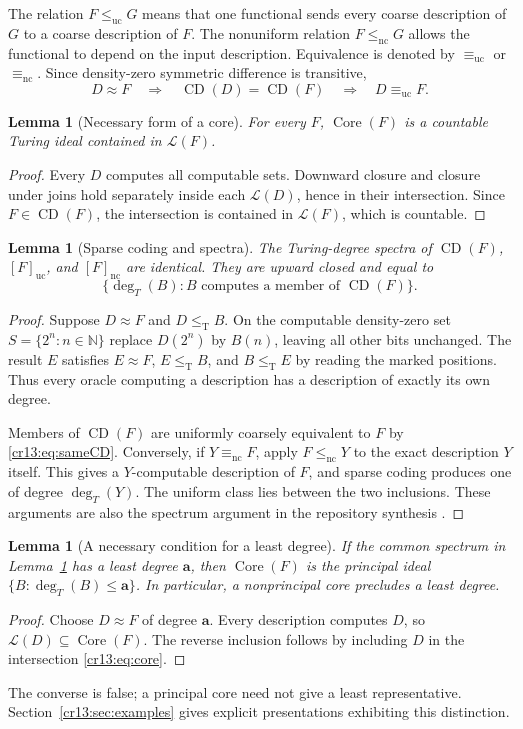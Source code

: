 \documentclass[11pt,letterpaper]{article}
\newtheorem{lemma}[theorem]{Lemma}
\theoremstyle{definition}
\theoremstyle{remark}\newtheorem{remark}[theorem]{Remark}
\numberwithin{equation}{section}
\newcommand{\N}{\mathbb N}
\newcommand{\leT}{\leq_{\mathrm T}}
\newcommand{\leuc}{\leq_{\mathrm{uc}}}
\newcommand{\lenc}{\leq_{\mathrm{nc}}}
\newcommand{\equc}{\equiv_{\mathrm{uc}}}
\newcommand{\eqnc}{\equiv_{\mathrm{nc}}}
\newcommand{\Low}{\mathcal L}
\newcommand{\Core}{\operatorname{Core}}
\newcommand{\CD}{\operatorname{CD}}
\begin{document}
The relation $F\leuc G$ means that one functional sends every coarse description of $G$ to a coarse description of $F$. The nonuniform relation $F\lenc G$ allows the functional to depend on the input description. Equivalence is denoted by $\equc$ or $\eqnc$. Since density-zero symmetric difference is transitive,
\begin{equation}\label{cr13:eq:sameCD}
       D\approx F\quad\Longrightarrow\quad
       \CD(D)=\CD(F)\quad\Longrightarrow\quad D\equc F.
\end{equation}

\begin{lemma}[Necessary form of a core]\label{cr13:lem:coreideal}
For every $F$, $\Core(F)$ is a countable Turing ideal contained in $\Low(F)$.
\end{lemma}
\begin{proof}
Every $D$ computes all computable sets. Downward closure and closure under joins hold separately inside each $\Low(D)$, hence in their intersection. Since $F\in\CD(F)$, the intersection is contained in $\Low(F)$, which is countable.
\end{proof}

\begin{lemma}[Sparse coding and spectra]\label{cr13:lem:spectra}
The Turing-degree spectra of $\CD(F)$, $[F]_{\mathrm{uc}}$, and $[F]_{\mathrm{nc}}$ are identical. They are upward closed and equal to
\[
 \{\deg_T(B): B\text{ computes a member of }\CD(F)\}.
\]
\end{lemma}
\begin{proof}
Suppose $D\approx F$ and $D\leT B$. On the computable density-zero set $S=\{2^n:n\in\N\}$ replace $D(2^n)$ by $B(n)$, leaving all other bits unchanged. The result $E$ satisfies $E\approx F$, $E\leT B$, and $B\leT E$ by reading the marked positions. Thus every oracle computing a description has a description of exactly its own degree.

Members of $\CD(F)$ are uniformly coarsely equivalent to $F$ by \eqref{cr13:eq:sameCD}. Conversely, if $Y\eqnc F$, apply $F\lenc Y$ to the exact description $Y$ itself. This gives a $Y$-computable description of $F$, and sparse coding produces one of degree $\deg_T(Y)$. The uniform class lies between the two inclusions. These arguments are also the spectrum argument in the repository synthesis \cite{Synthesis}.
\end{proof}

\begin{lemma}[A necessary condition for a least degree]\label{cr13:lem:leastcore}
If the common spectrum in Lemma~\ref{cr13:lem:spectra} has a least degree $\mathbf a$, then $\Core(F)$ is the principal ideal $\{B:\deg_T(B)\le\mathbf a\}$. In particular, a nonprincipal core precludes a least degree.
\end{lemma}
\begin{proof}
Choose $D\approx F$ of degree $\mathbf a$. Every description computes $D$, so $\Low(D)\subseteq\Core(F)$. The reverse inclusion follows by including $D$ in the intersection \eqref{cr13:eq:core}.
\end{proof}
The converse is false; a principal core need not give a least representative. Section~\ref{cr13:sec:examples} gives explicit presentations exhibiting this distinction.
\end{document}
